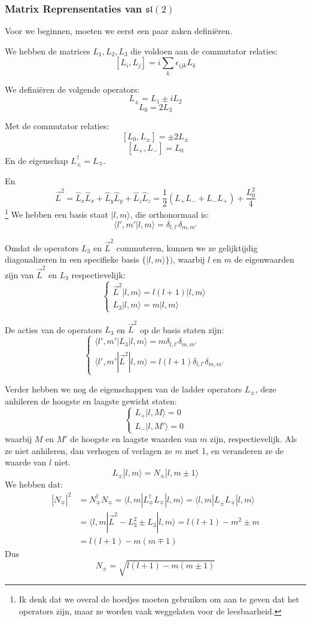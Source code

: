\subsubsection{Matrix Reprensentaties van \(\mathfrak{sl}(2)\)}

Voor we beginnen, moeten we eerst een paar zaken definiëren.

We hebben de matrices \(L_1, L_2, L_3\) die voldoen aan de commutator relaties:
\[[L_i,L_j] = i \sum_k \epsilon_{ijk}L_k\]

We definiëren de volgende operators:
\[L_\pm = L_1 \pm i L_2\]
\[L_0 = 2L_3\]

Met de commutator relaties:
\[[L_0, L_\pm] = \pm 2 L_\pm\]
\[[L_+, L_-] = L_0\]
En de eigenschap \(L_\pm^\dagger = L_\mp\).

En
\[\vec{L}^2 = \hat{L}_x \hat{L}_x + \hat{L}_y \hat{L}_y + \hat{L}_z \hat{L}_z = \frac{1}{2}(L_+ L_- + L_- L_+) + \frac{L_0^2}{4}\]
\footnote{Ik denk dat we overal de hoedjes moeten gebruiken om aan te geven dat het operators zijn, maar ze worden vaak weggelaten voor de leesbaarheid.}
We hebben een basis staat \(|l,m \rangle\), die orthonormaal is:
\[\langle l',m' | l,m \rangle = \delta_{l,l'} \delta_{m,m'}\]

Omdat de operators \(L_3\) en \(\vec{L}^2\) commuteren, kunnen we ze gelijktijdig diagonalizeren in een specifieke basis \(\{|l,m \rangle\})\),
waarbij \(l\) en \(m\) de eigenwaarden zijn van \(\vec{L}^2\) en \(L_3\) respectievelijk:
\[
\begin{cases}
\vec{L}^2 |l,m \rangle = l(l+1) |l,m \rangle \\
L_3 |l,m \rangle = m |l,m \rangle
\end{cases}
\]

De acties van de operators \(L_3\) en \(\vec{L}^2\) op de basis staten zijn:
\[
\begin{cases}
\langle l',m'| L_3 |l,m \rangle = m \delta_{l,l'} \delta_{m,m'} \\
\langle l',m'| \vec{L}^2 |l,m \rangle = l(l+1) \delta_{l,l'} \delta_{m,m'}
\end{cases}
\]

Verder hebben we nog de eigenschappen van de ladder operators \(L_\pm\), deze anhileren de hoogste en laagste gewicht staten:
\[
\begin{cases}
L_+ |l,M \rangle = 0 \\
L_- |l,M' \rangle = 0
\end{cases}
\]
waarbij \(M\) en \(M'\) de hoogste en laagste waarden van \(m\) zijn, respectievelijk.
Als ze niet anhileren, dan verhogen of verlagen ze \(m\) met 1, en veranderen ze de waarde van \(l\) niet.
\[L_\pm |l,m \rangle = N_\pm | l , m \pm 1 \rangle\]
We hebben dat:
\begin{align*}
    |N_\mp|^2
    &= N_\mp^\dagger N_\mp
    = \langle l,m | L_\mp^\dagger L_\mp | l,m \rangle
    = \langle l,m | L_\pm L_\mp | l,m \rangle \\
    &= \langle l,m | \vec{L}^2 - L_3^2 \pm L_3 | l,m \rangle
    = l(l+1) - m^2 \pm m \\
    &= l(l+1) - m(m \mp 1)
\end{align*}
Dus
\[ N_\pm = \sqrt{l(l+1) - m(m \pm 1)} \]

